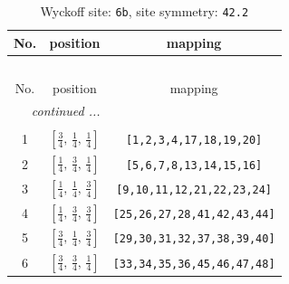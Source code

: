 \documentclass[fleqn,8pt]{jsarticle}
\begin{document}
\begin{longtable}{ccc}
\caption{Wyckoff site: {\tt 6b}, site symmetry: {\tt 42.2}}
 \\
 \hline \hline
No. & position & mapping \\ \hline \endfirsthead

\multicolumn{2}{l}{\tablename\ \thetable{}} \\
 \hline \hline
No. & position & mapping \\ \hline \endhead

 \hline \hline
\multicolumn{2}{r}{\footnotesize\it continued ...} \\ \endfoot

 \hline \hline
\multicolumn{2}{r}{} \\ \endlastfoot

1 & $\left[ \frac{3}{4},\, \frac{1}{4},\, \frac{1}{4} \right]$ & {\tt [1,2,3,4,17,18,19,20]} \\ \hline
2 & $\left[ \frac{1}{4},\, \frac{3}{4},\, \frac{1}{4} \right]$ & {\tt [5,6,7,8,13,14,15,16]} \\ \hline
3 & $\left[ \frac{1}{4},\, \frac{1}{4},\, \frac{3}{4} \right]$ & {\tt [9,10,11,12,21,22,23,24]} \\ \hline
4 & $\left[ \frac{1}{4},\, \frac{3}{4},\, \frac{3}{4} \right]$ & {\tt [25,26,27,28,41,42,43,44]} \\ \hline
5 & $\left[ \frac{3}{4},\, \frac{1}{4},\, \frac{3}{4} \right]$ & {\tt [29,30,31,32,37,38,39,40]} \\ \hline
6 & $\left[ \frac{3}{4},\, \frac{3}{4},\, \frac{1}{4} \right]$ & {\tt [33,34,35,36,45,46,47,48]} \\
\end{longtable}
\renewcommand{\arraystretch}{1.2}
\end{document}
